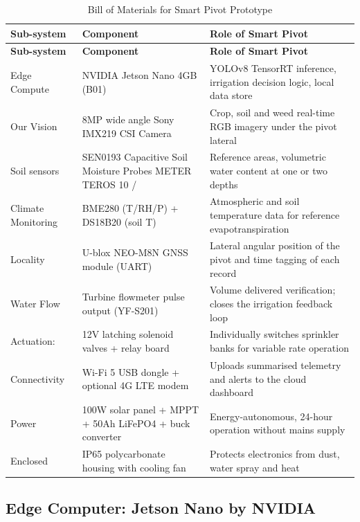 \documentclass[12pt,a4paper]{report}
\renewcommand{\arraystretch}{1.25}
\begin{document}
\begingroup
\small
\setlength{\parskip}{0pt}
\setlength{\tabcolsep}{4pt}
\renewcommand{\arraystretch}{1.2}
\begin{longtable}{|P{0.20\textwidth}|P{0.30\textwidth}|P{0.38\textwidth}|}
\caption{Bill of Materials for Smart Pivot Prototype}\\
\hline
\textbf{Sub-system} & \textbf{Component} & \textbf{Role of Smart Pivot} \\ \hline
\endfirsthead
\hline
\textbf{Sub-system} & \textbf{Component} & \textbf{Role of Smart Pivot} \\ \hline
\endhead
Edge Compute & NVIDIA Jetson Nano 4GB (B01) & YOLOv8 TensorRT inference, irrigation decision logic, local data store \\ \hline
Our Vision & 8MP wide angle Sony IMX219 CSI Camera & Crop, soil and weed real-time RGB imagery under the pivot lateral \\ \hline
Soil sensors & SEN0193 Capacitive Soil Moisture Probes METER TEROS 10 / & Reference areas, volumetric water content at one or two depths \\ \hline
Climate Monitoring & BME280 (T/RH/P) + DS18B20 (soil T) & Atmospheric and soil temperature data for reference evapotranspiration \\ \hline
Locality & U-blox NEO-M8N GNSS module (UART) & Lateral angular position of the pivot and time tagging of each record \\ \hline
Water Flow & Turbine flowmeter pulse output (YF-S201) & Volume delivered verification; closes the irrigation feedback loop \\ \hline
Actuation: & 12V latching solenoid valves + relay board & Individually switches sprinkler banks for variable rate operation \\ \hline
Connectivity & Wi-Fi 5 USB dongle + optional 4G LTE modem & Uploads summarised telemetry and alerts to the cloud dashboard \\ \hline
Power & 100W solar panel + MPPT + 50Ah LiFePO4 + buck converter & Energy-autonomous, 24-hour operation without mains supply \\ \hline
Enclosed & IP65 polycarbonate housing with cooling fan & Protects electronics from dust, water spray and heat \\ \hline
\end{longtable}
\endgroup

\subsection{Edge Computer: Jetson Nano by NVIDIA}
\end{document}
